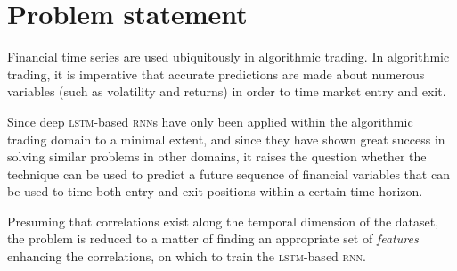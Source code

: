 \section{Problem statement}
Financial time series are used ubiquitously in algorithmic trading. In algorithmic trading, it is imperative that accurate predictions are made about numerous variables (such as volatility and returns) in order to time market entry and exit.

Since deep \textsc{lstm}-based \textsc{rnn}s have only been applied within the algorithmic trading domain to a minimal extent, and since they have shown great success in solving similar problems in other domains, it raises the question whether the technique can be used to predict a future sequence of financial variables that can be used to time both entry and exit positions within a certain time horizon.

Presuming that correlations exist along the temporal dimension of the dataset, the problem is reduced to a matter of finding an appropriate set of \textit{features} enhancing the correlations, on which to train the \textsc{lstm}-based \textsc{rnn}.
